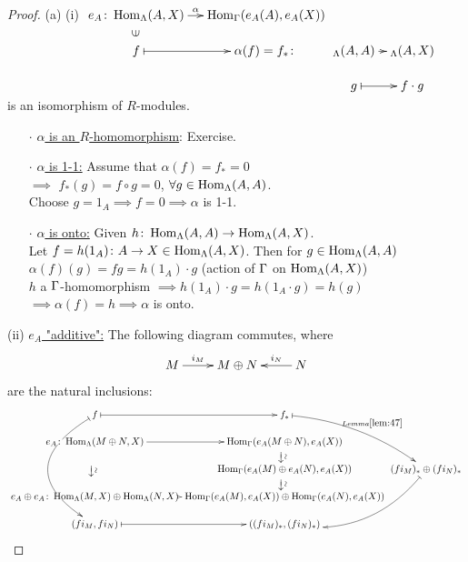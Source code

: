 \begin{proof}
(a) (i) $\xymatrix@R-1pc@C-2pc{
e_A \colon \Hom_\Lambda(A, X) \ar[rrr]^-\alpha &&& \Hom_\G(e_A(A), e_A(X))\\
f \ar@{}[u]|-*[@]{\in} \ar@{|->}[rrr] &&& \alpha(f) = f_* \colon  & {}_{\Lambda}(A,A) \ar[rr] && {}_\Lambda(A,X)\\
                                    & & &                  &    g \ar@{|->}[rr]   &&  f \cdot g
}$\\ is an isomorphism of $R$-modules.
\begin{itemize}
\item[$\cdot$] \underline{$\alpha$ is an $R$-homomorphism}: Exercise.
\item[$\cdot$] \underline{$\alpha$ is 1-1:} Assume that $\alpha(f)=f_*=0$\\
$\implies$ $f_*(g) = f \circ g = 0$, $\forall g \in \operatorname{Hom}_\Lambda(A, A)$.\\
Choose $g= 1_A \implies f = 0 \implies \alpha$ is 1-1.
\item[$\cdot$] \underline{$\alpha$ is onto:} Given $h\colon \operatorname{Hom}_\Lambda(A,A) \to \operatorname{Hom}_\Lambda(A, X)$.\\ 
Let $f = h(1_A)\colon A \to X \in \operatorname{Hom}_\Lambda(A,X)$. Then for $g \in \operatorname{Hom}_\Lambda(A,A)$\\
$\alpha(f)(g) = fg = h(1_A) \cdot g$ (action of $\Gamma$ on $\operatorname{Hom}_\Lambda(A, X)$)\\
$h$ a $\Gamma$-homomorphism $\implies h(1_A)\cdot g = h(1_A \cdot g) = h(g)$\\
$\implies \alpha(f) = h \implies \alpha$ is onto.
\end{itemize}

(ii) \underline{$e_A$ "additive":} The following diagram commutes,
where 
\[\xymatrix{M \ar[r]^-{i_M} & M \oplus N & \ar[l]_-{i_N} N}\]
are the natural inclusions:
\[\xymatrix@R-1pc@C-2pc{
f \ar@{|->}[r] \ar@{|->}@/_4pc/[dddd]|!{[d];[dr]}\hole|!{[ddd];[dddr]}\hole & f_* \ar@{|->}@/^1pc/[ddr]^{Lemma \ref{lem:47}}\\
e_A\colon \Hom_\Lambda(M \oplus N, X) \ar[r] \ar@{}[dd]|-*[@]{\xrightarrow{\sim}}& \Hom_\G(e_A(M\oplus N), e_A(X)) \ar@{}[d]|-*[@]{\xrightarrow{\sim}}\\
 & \Hom_\G(e_A(M)\oplus e_A(N), e_A(X)) \ar@{}[d]|-*[@]{\xrightarrow{\sim}} & (fi_M)_* \oplus (fi_N)_* \ar@{|->}@/^2pc/[ddl]\\
e_A \oplus e_A\colon \Hom_\Lambda(M, X) \oplus \Hom_\Lambda(N, X) \ar[r] & \Hom_\G(e_A(M), e_A(X)) \oplus \Hom_\G(e_A(N), e_A(X))\\
(fi_M, fi_N) \ar@{|->}[r] & ((fi_M)_*, (fi_N)_*)\\
}\]


\end{proof}

